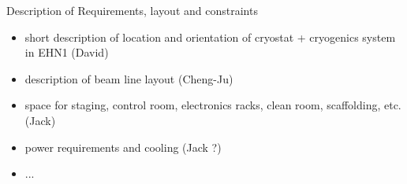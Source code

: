 Description of Requirements, layout and constraints

\begin{itemize}
\item short description of location and orientation of cryostat + cryogenics system in EHN1 (David)

\item description of beam line layout (Cheng-Ju)

\item space for staging, control room, electronics racks, clean room, scaffolding, etc. (Jack)

\item power requirements and cooling  (Jack ?)

\item ...

\end{itemize}
